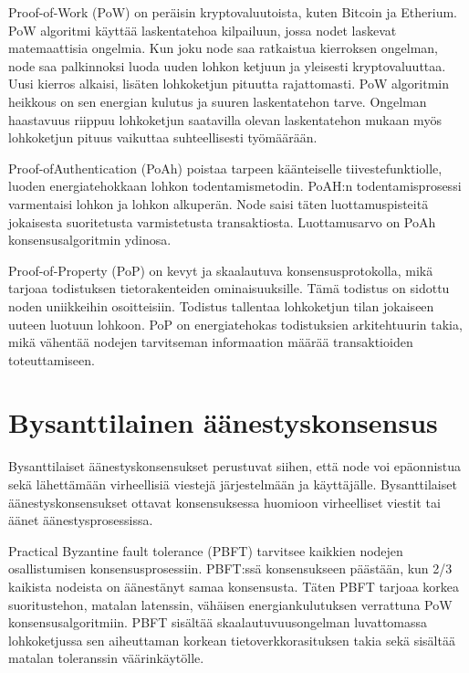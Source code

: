 \documentclass[utf8,bachelor]{gradu3}
\begin{document}
Proof-of-Work (PoW) on peräisin kryptovaluutoista, kuten Bitcoin ja Etherium. PoW algoritmi käyttää laskentatehoa kilpailuun, jossa nodet laskevat matemaattisia ongelmia. 
Kun joku node saa ratkaistua kierroksen ongelman, node saa palkinnoksi luoda uuden lohkon ketjuun ja yleisesti kryptovaluuttaa. Uusi kierros alkaisi, lisäten lohkoketjun pituutta rajattomasti. PoW algoritmin heikkous on sen energian kulutus ja suuren laskentatehon tarve. 
Ongelman haastavuus riippuu lohkoketjun saatavilla olevan laskentatehon mukaan myös lohkoketjun pituus vaikuttaa suhteellisesti työmäärään.

Proof-ofAuthentication (PoAh) poistaa tarpeen käänteiselle tiivestefunktiolle, luoden energiatehokkaan lohkon todentamismetodin. PoAH:n todentamisprosessi varmentaisi lohkon ja lohkon alkuperän.
Node saisi täten luottamuspisteitä jokaisesta suoritetusta varmistetusta transaktiosta. Luottamusarvo on PoAh konsensusalgoritmin ydinosa.

Proof-of-Property (PoP) on kevyt ja skaalautuva konsensusprotokolla, mikä tarjoaa todistuksen tietorakenteiden ominaisuuksille. Tämä todistus on sidottu noden uniikkeihin osoitteisiin. Todistus tallentaa lohkoketjun tilan jokaiseen uuteen luotuun lohkoon. PoP on energiatehokas todistuksien arkitehtuurin takia, mikä vähentää nodejen tarvitseman informaation määrää transaktioiden toteuttamiseen.

\section{Bysanttilainen äänestyskonsensus}
Bysanttilaiset äänestyskonsensukset perustuvat siihen, että node voi epäonnistua sekä lähettämään virheellisiä viestejä järjestelmään ja käyttäjälle. 
Bysanttilaiset äänestyskonsensukset ottavat konsensuksessa huomioon virheelliset viestit tai äänet äänestysprosessissa.

Practical Byzantine fault tolerance (PBFT) tarvitsee kaikkien nodejen osallistumisen konsensusprosessiin.
PBFT:ssä konsensukseen päästään, kun 2/3 kaikista nodeista on äänestänyt samaa konsensusta.
Täten PBFT tarjoaa korkea suoritustehon, matalan latenssin, vähäisen energiankulutuksen verrattuna PoW konsensusalgoritmiin.
PBFT sisältää skaalautuvuusongelman luvattomassa lohkoketjussa sen aiheuttaman korkean tietoverkkorasituksen takia sekä sisältää matalan toleranssin väärinkäytölle.
\end{document}
